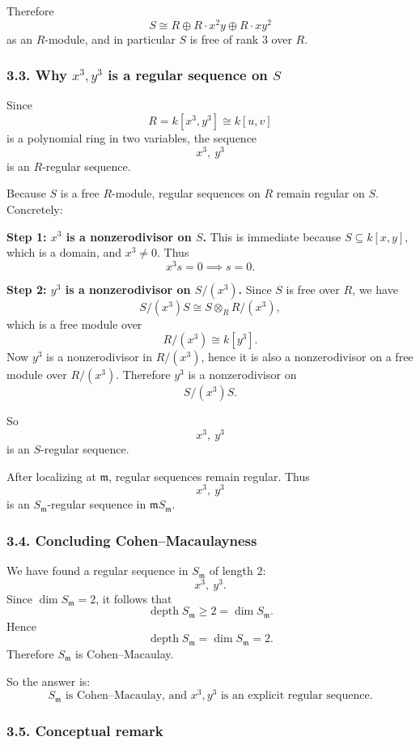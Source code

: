 \documentclass[12pt,a4paper]{article}
\theoremstyle{notespace}
\DeclareMathOperator{\depth}{depth}
\begin{document}
Therefore
\[
S \cong R \oplus R\cdot x^2y \oplus R\cdot xy^2
\]
as an \(R\)-module, and in particular \(S\) is free of rank \(3\) over \(R\).

\subsubsection{3.3. Why \(x^3,y^3\) is a regular sequence on \(S\)}

Since
\[
R=k[x^3,y^3]\cong k[u,v]
\]
is a polynomial ring in two variables, the sequence
\[
x^3,\ y^3
\]
is an \(R\)-regular sequence.

Because \(S\) is a free \(R\)-module, regular sequences on \(R\) remain regular on \(S\). Concretely:

\medskip

\textbf{Step 1: \(x^3\) is a nonzerodivisor on \(S\).}
This is immediate because \(S\subseteq k[x,y]\), which is a domain, and \(x^3\neq 0\). Thus
\[
x^3s=0 \implies s=0.
\]

\medskip

\textbf{Step 2: \(y^3\) is a nonzerodivisor on \(S/(x^3)\).}
Since \(S\) is free over \(R\), we have
\[
S/(x^3)S \cong S\otimes_R R/(x^3),
\]
which is a free module over
\[
R/(x^3)\cong k[y^3].
\]
Now \(y^3\) is a nonzerodivisor in \(R/(x^3)\), hence it is also a nonzerodivisor on a free module over \(R/(x^3)\). Therefore \(y^3\) is a nonzerodivisor on
\[
S/(x^3)S.
\]

So
\[
x^3,\ y^3
\]
is an \(S\)-regular sequence.

After localizing at \(\mathfrak m\), regular sequences remain regular. Thus
\[
x^3,\ y^3
\]
is an \(S_{\mathfrak m}\)-regular sequence in \(\mathfrak m S_{\mathfrak m}\).

\subsubsection{3.4. Concluding Cohen--Macaulayness}

We have found a regular sequence in \(S_{\mathfrak m}\) of length \(2\):
\[
x^3,\ y^3.
\]
Since \(\dim S_{\mathfrak m}=2\), it follows that
\[
\depth S_{\mathfrak m}\ge 2=\dim S_{\mathfrak m}.
\]
Hence
\[
\depth S_{\mathfrak m}=\dim S_{\mathfrak m}=2.
\]
Therefore \(S_{\mathfrak m}\) is Cohen--Macaulay.

So the answer is:
\[
\boxed{S_{\mathfrak m}\text{ is Cohen--Macaulay, and }x^3,y^3\text{ is an explicit regular sequence.}}
\]

\subsubsection{3.5. Conceptual remark}
\end{document}
